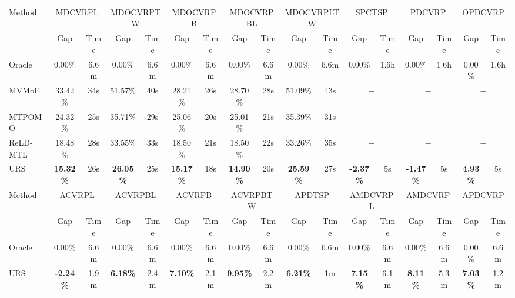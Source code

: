 \documentclass{article}
\theoremstyle{plain}
\theoremstyle{definition}
\theoremstyle{remark}
\begin{document}
\begin{table}[t]
{\begin{tabular}{l|cc|cc|cc|cc|cc|cc|cc|cc}
    \midrule
    \midrule
    \multirow{2}[2]{*}{Method} & \multicolumn{2}{c|}{MDCVRPL} & \multicolumn{2}{c|}{MDOCVRPTW} & \multicolumn{2}{c|}{MDOCVRPB} & \multicolumn{2}{c|}{MDOCVRPBL} & \multicolumn{2}{c|}{MDOCVRPLTW} & \multicolumn{2}{c|}{SPCTSP} & \multicolumn{2}{c|}{PDCVRP} & \multicolumn{2}{c}{OPDCVRP} \\
          & Gap   & Time  & Gap   & Time  & Gap   & Time  & Gap   & Time  & Gap   & Time  & Gap   & Time  & Gap   & Time  & Gap   & Time \\
    \midrule
    Oracle  & 0.00\% & 6.6m  & 0.00\% & 6.6m  & 0.00\% & 6.6m  & 0.00\% & 6.6m  & 0.00\% & 6.6m  & 0.00\% & 1.6h  & 0.00\% & 1.6h  & 0.00\% & 1.6h \\
    MVMoE & 33.42\% & 34s   & 51.57\% & 40s   & 28.21\% & 26s   & 28.70\% & 28s   & 51.09\% & 43s   & \multicolumn{2}{c|}{$-$} & \multicolumn{2}{c|}{$-$} & \multicolumn{2}{c}{$-$} \\
    MTPOMO & 24.32\% & 25s   & 35.71\% & 29s   & 25.06\% & 20s   & 25.01\% & 21s   & 35.39\% & 31s   & \multicolumn{2}{c|}{$-$} & \multicolumn{2}{c|}{$-$} & \multicolumn{2}{c}{$-$} \\
    ReLD-MTL & 18.48\% & 28s   & 33.55\% & 33s   & 18.50\% & 21s   & 18.50\% & 22s   & 33.26\% & 35s   & \multicolumn{2}{c|}{$-$} & \multicolumn{2}{c|}{$-$} & \multicolumn{2}{c}{$-$} \\
    URS   & \cellcolor[HTML]{D0CECE}\textbf{15.32\%} & 26s   & \cellcolor[HTML]{D0CECE}\textbf{26.05\%} & 25s   & \cellcolor[HTML]{D0CECE}\textbf{15.17\%} & 18s   & \cellcolor[HTML]{D0CECE}\textbf{14.90\%} & 20s   & \cellcolor[HTML]{D0CECE}\textbf{25.59\%} & 27s   & \cellcolor[HTML]{D0CECE}\textbf{-2.37\%} & 5s    & \cellcolor[HTML]{D0CECE}\textbf{-1.47\%} & 5s    & \cellcolor[HTML]{D0CECE}\textbf{4.93\%} & 5s \\
    \midrule
    \midrule
    \multirow{2}[2]{*}{Method} & \multicolumn{2}{c|}{ACVRPL} & \multicolumn{2}{c|}{ACVRPBL} & \multicolumn{2}{c|}{ACVRPB} & \multicolumn{2}{c|}{ACVRPBTW} & \multicolumn{2}{c|}{APDTSP} & \multicolumn{2}{c|}{AMDCVRPL} & \multicolumn{2}{c|}{AMDCVRP} & \multicolumn{2}{c}{APDCVRP} \\
          & Gap   & Time  & Gap   & Time  & Gap   & Time  & Gap   & Time  & Gap   & Time  & Gap   & Time  & Gap   & Time  & Gap   & Time \\
    \midrule
    Oracle  & 0.00\% & 6.6m  & 0.00\% & 6.6m  & 0.00\% & 6.6m  & 0.00\% & 6.6m  & 0.00\% & 6.6m  & 0.00\% & 6.6m  & 0.00\% & 6.6m  & 0.00\% & 6.6m \\
    URS   & \cellcolor[HTML]{D0CECE}\textbf{-2.24\%} & 1.9m  & \cellcolor[HTML]{D0CECE}\textbf{6.18\%} & 2.4m  & \cellcolor[HTML]{D0CECE}\textbf{7.10\%} & 2.1m  & \cellcolor[HTML]{D0CECE}\textbf{9.95\%} & 2.2m  & \cellcolor[HTML]{D0CECE}\textbf{6.21\%} & 1m    & \cellcolor[HTML]{D0CECE}\textbf{7.15\%} & 6.1m  & \cellcolor[HTML]{D0CECE}\textbf{8.11\%} & 5.3m  & \cellcolor[HTML]{D0CECE}\textbf{7.03\%} & 1.2m \\

\end{tabular}}
\end{table}
\end{document}
